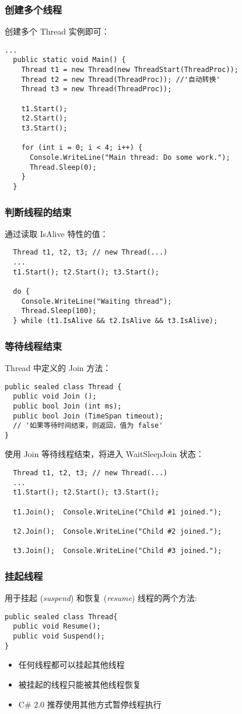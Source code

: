 \begin{frame}[fragile]
\frametitle{创建多个线程}
创建多个 Thread 实例即可：
\begin{lstlisting}[escapeinside='']
...
  public static void Main() {
    Thread t1 = new Thread(new ThreadStart(ThreadProc));
    Thread t2 = new Thread(ThreadProc)); //'自动转换'
    Thread t3 = new Thread(ThreadProc));

    t1.Start();
    t2.Start();
    t3.Start();

    for (int i = 0; i < 4; i++) {
      Console.WriteLine("Main thread: Do some work.");
      Thread.Sleep(0);
    }
  }
\end{lstlisting}
\end{frame}

\begin{frame}[fragile]
\frametitle{判断线程的结束}
通过读取 IsAlive 特性的值：
\begin{lstlisting}
  Thread t1, t2, t3; // new Thread(...)
  ...
  t1.Start(); t2.Start(); t3.Start();

  do {
    Console.WriteLine("Waiting thread");
    Thread.Sleep(100);
  } while (t1.IsAlive && t2.IsAlive && t3.IsAlive);

\end{lstlisting}
\end{frame}

\begin{frame}[fragile]
\frametitle{等待线程结束}
Thread 中定义的 Join 方法：
\begin{lstlisting}[escapeinside='']
public sealed class Thread {
  public void Join ();
  public bool Join (int ms);
  public bool Join (TimeSpan timeout);
  // '如果等待时间结束，则返回，值为 false'
}
\end{lstlisting}
\pause
使用 Join 等待线程结束，将进入 WaitSleepJoin 状态：
\begin{lstlisting}
  Thread t1, t2, t3; // new Thread(...)
  ...
  t1.Start(); t2.Start(); t3.Start();

  t1.Join();  Console.WriteLine("Child #1 joined.");

  t2.Join();  Console.WriteLine("Child #2 joined.");

  t3.Join();  Console.WriteLine("Child #3 joined.");

\end{lstlisting}
\end{frame}

\begin{frame}[fragile]
\frametitle{挂起线程}
用于挂起 (\textit{suspend}) 和恢复 (\textit{resume}) 线程的两个方法: 
\begin{lstlisting}
public sealed class Thread{
  public void Resume();
  public void Suspend();
}
\end{lstlisting}
\begin{itemize}
\item 任何线程都可以挂起其他线程
\item 被挂起的线程只能被其他线程恢复
\item C\# 2.0 推荐使用其他方式暂停线程执行
\end{itemize}

\end{frame}


